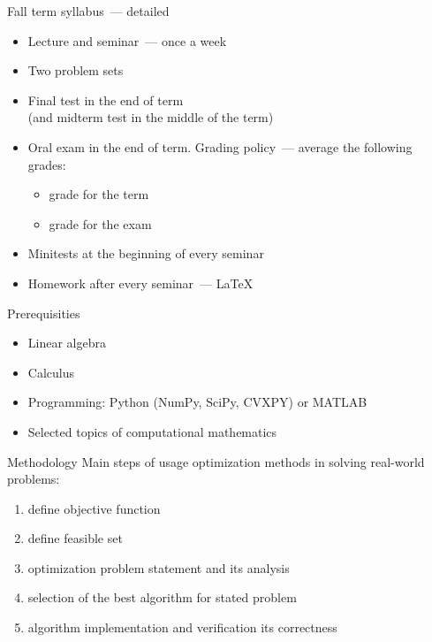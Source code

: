 \documentclass[12pt]{beamer}
\begin{document}
\begin{frame}{Fall term syllabus~--- detailed}
\begin{itemize}
\item Lecture and seminar~--- once a week
\item Two problem sets
\item Final test in the end of term \\ (and midterm test in the middle of the term)
\item Oral exam in the end of term. 
Grading policy~--- average the following grades:
\begin{itemize}
\item grade for the term 
\item grade for the exam
\end{itemize}
\item Minitests at the beginning of every seminar 
\item Homework after every seminar~--- \LaTeX
\end{itemize}
\end{frame}

\begin{frame}{Prerequisities}
\begin{itemize}
\item Linear algebra
\item Calculus
\item Programming: Python (NumPy, SciPy, CVXPY) or MATLAB
\item Selected topics of computational mathematics
\end{itemize}
\end{frame}

\begin{frame}{Methodology}
Main steps of usage optimization methods in solving real-world problems:
\begin{enumerate}
\item define objective function
\item define feasible set
\item optimization problem statement and its analysis
\item selection of the best algorithm for stated problem
\item algorithm implementation and verification its correctness
\end{enumerate}

\end{frame}
\end{document}
